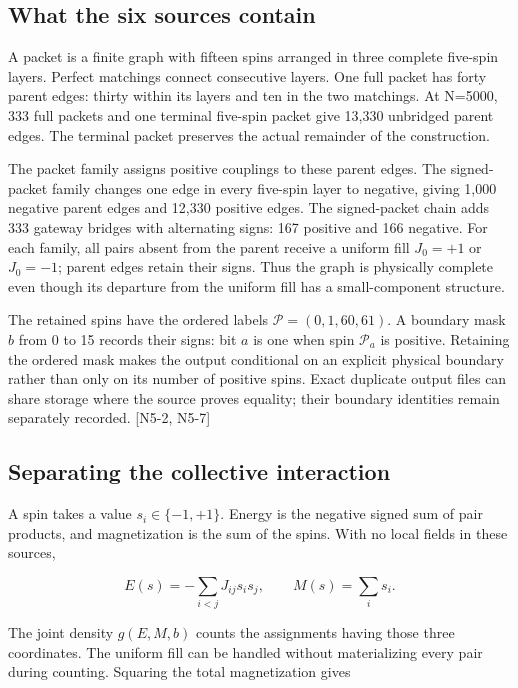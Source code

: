 \subsection{What the six sources contain}\label{what-the-six-sources-contain}

A packet is a finite graph with fifteen spins arranged in three complete five-spin layers. Perfect matchings connect consecutive layers. One full packet has forty parent edges: thirty within its layers and ten in the two matchings. At N=5000, 333 full packets and one terminal five-spin packet give 13,330 unbridged parent edges. The terminal packet preserves the actual remainder of the construction.

The packet family assigns positive couplings to these parent edges. The signed-packet family changes one edge in every five-spin layer to negative, giving 1,000 negative parent edges and 12,330 positive edges. The signed-packet chain adds 333 gateway bridges with alternating signs: 167 positive and 166 negative. For each family, all pairs absent from the parent receive a uniform fill \(J_0=+1\) or \(J_0=-1\); parent edges retain their signs. Thus the graph is physically complete even though its departure from the uniform fill has a small-component structure.

The retained spins have the ordered labels \(\mathcal P=(0,1,60,61)\). A boundary mask \(b\) from 0 to 15 records their signs: bit \(a\) is one when spin \(\mathcal P_a\) is positive. Retaining the ordered mask makes the output conditional on an explicit physical boundary rather than only on its number of positive spins. Exact duplicate output files can share storage where the source proves equality; their boundary identities remain separately recorded. {[}N5-2, N5-7{]}

\subsection{Separating the collective interaction}\label{separating-the-collective-interaction}

A spin takes a value \(s_i\in\{-1,+1\}\). Energy is the negative signed sum of pair products, and magnetization is the sum of the spins. With no local fields in these sources,

\[\displaystyle E(s)=-\sum_{i<j}J_{ij}s_i s_j,\qquad M(s)=\sum_i s_i.\]

The joint density \(g(E,M,b)\) counts the assignments having those three coordinates. The uniform fill can be handled without materializing every pair during counting. Squaring the total magnetization gives

